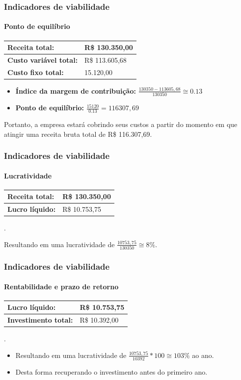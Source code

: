 \documentclass{beamer}
\begin{document}
\begin{frame}
  \frametitle{Indicadores de viabilidade}
  \framesubtitle{Ponto de equilíbrio}

  \begin{tabular}{| l | l |}
    \hline
    \textbf{Receita total:} & R\$ 130.350,00 \\ \hline
    \textbf{Custo variável total:} & R\$ 113.605,68 \\ \hline
    \textbf{Custo fixo total:} & 15.120,00 \\ \hline
  \end{tabular}

  \begin{itemize}
    \item \textbf{Índice da margem de contribuição:} $\frac{130350 - 113605,68}{130350} \cong 0.13$
    \item \textbf{Ponto de equilíbrio:} $\frac{15120}{0.13} = 116307,69$
  \end{itemize}

  Portanto, a empresa estará cobrindo seus custos a partir do momento em que atingir uma receita bruta total de R\$ 116.307,69.
\end{frame}

\begin{frame}
  \frametitle{Indicadores de viabilidade}
  \framesubtitle{Lucratividade}

  \begin{tabular}{| l | l |}
    \hline
    \textbf{Receita total:} & R\$ 130.350,00 \\ \hline
    \textbf{Lucro líquido:} & R\$ 10.753,75 \\ \hline
  \end{tabular}

  .\newline \newline

  Resultando em uma lucratividade de $\frac{10753,75}{130350} \cong 8\%$.
\end{frame}

\begin{frame}
  \frametitle{Indicadores de viabilidade}
  \framesubtitle{Rentabilidade e prazo de retorno}

  \begin{tabular}{| l | l |}
    \hline
    \textbf{Lucro líquido:} & R\$ 10.753,75 \\ \hline
    \textbf{Investimento total:} & R\$ 10.392,00 \\ \hline
  \end{tabular}

  .\newline \newline

  \begin{itemize}
    \item Resultando em uma lucratividade de $\frac{10753,75}{10392}*100 \cong 103\%$ ao ano.
    \item Desta forma recuperando o investimento antes do primeiro ano.
  \end{itemize}
\end{frame}
\end{document}
